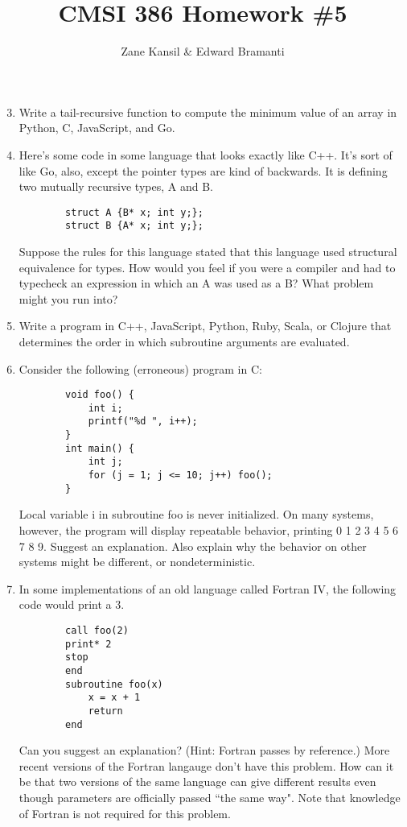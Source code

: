 \documentclass{article}
\title{CMSI 386 Homework \#5}
\author{Zane Kansil \& Edward Bramanti}
\begin{document}
\maketitle
\begin{enumerate}
	\setcounter{enumi}{2}
	\item Write a tail-recursive function to compute the minimum value of an array in Python, C, JavaScript, and Go.
	\pagebreak
	\item Here's some code in some language that looks exactly like C++. It's sort of like Go, also, except the pointer types are kind of backwards. It is defining two mutually recursive types, A and B.
	\begin{verbatim}
    	struct A {B* x; int y;};
    	struct B {A* x; int y;};
    \end{verbatim}
	Suppose the rules for this language stated that this language used structural equivalence for types. How would you feel if you were a compiler and had to typecheck an expression in which an A was used as a B? What problem might you run into?
	\pagebreak
	\item Write a program in C++, JavaScript, Python, Ruby, Scala, or Clojure that determines the order in which subroutine arguments are evaluated.
	\pagebreak
	\item Consider the following (erroneous) program in C:
	\begin{verbatim}
		void foo() {
		    int i;
		    printf("%d ", i++);
		}
		int main() {
		    int j;
		    for (j = 1; j <= 10; j++) foo();
		}
	\end{verbatim}
	Local variable i in subroutine foo is never initialized. On many systems, however, the program will display repeatable behavior, printing 0 1 2 3 4 5 6 7 8 9. Suggest an explanation. Also explain why the behavior on other systems might be different, or nondeterministic.
	\setcounter{enumi}{7}
	\pagebreak
	\item In some implementations of an old language called Fortran IV, the following code would print a 3. 
	\begin{verbatim} 
	    call foo(2)
	    print* 2
	    stop
	    end
	    subroutine foo(x)
	        x = x + 1
	        return
	    end
    \end{verbatim}
	Can you suggest an explanation? (Hint: Fortran passes by reference.) More recent versions of the Fortran langauge don't have this problem. How can it be that two versions of the same language can give different results even though parameters are officially passed ``the same way". Note that knowledge of Fortran is not required for this problem.

\end{enumerate}
\end{document}
